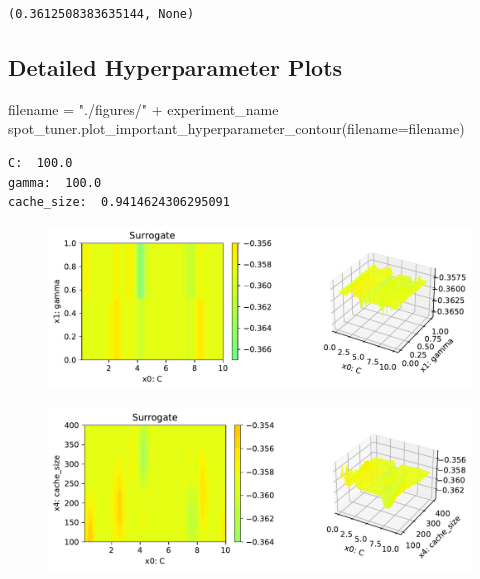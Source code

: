\documentclass[
  letterpaper,
  DIV=11,
  numbers=noendperiod]{scrreprt}
\newenvironment{Shaded}{\begin{snugshade}}{\end{snugshade}}
\newcommand{\NormalTok}[1]{\textcolor[rgb]{0.00,0.23,0.31}{#1}}
\newcommand{\OperatorTok}[1]{\textcolor[rgb]{0.37,0.37,0.37}{#1}}
\newcommand{\StringTok}[1]{\textcolor[rgb]{0.13,0.47,0.30}{#1}}
\begin{document}
\begin{verbatim}
(0.3612508383635144, None)
\end{verbatim}

\hypertarget{detailed-hyperparameter-plots-5}{%
\subsection{Detailed Hyperparameter
Plots}\label{detailed-hyperparameter-plots-5}}

\begin{Shaded}
\begin{Highlighting}[]
\NormalTok{filename }\OperatorTok{=} \StringTok{"./figures/"} \OperatorTok{+}\NormalTok{ experiment\_name}
\NormalTok{spot\_tuner.plot\_important\_hyperparameter\_contour(filename}\OperatorTok{=}\NormalTok{filename)}
\end{Highlighting}
\end{Shaded}

\begin{verbatim}
C:  100.0
gamma:  100.0
cache_size:  0.9414624306295091
\end{verbatim}

\begin{figure}[H]

{\centering \includegraphics{18_spot_hpt_sklearn_multiclass_classification_svc_files/figure-pdf/cell-48-output-2.pdf}

}

\end{figure}

\begin{figure}[H]

{\centering \includegraphics{18_spot_hpt_sklearn_multiclass_classification_svc_files/figure-pdf/cell-48-output-3.pdf}

}

\end{figure}
\end{document}

